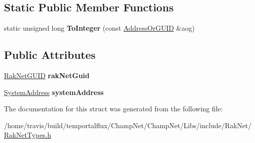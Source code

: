 \subsection*{Static Public Member Functions}
\begin{DoxyCompactItemize}
\item 
\hypertarget{struct_rak_net_1_1_address_or_g_u_i_d_abcfbbfab64e1ff1267ba5b56d57fe726}{static unsigned long {\bfseries To\-Integer} (const \hyperlink{struct_rak_net_1_1_address_or_g_u_i_d}{Address\-Or\-G\-U\-I\-D} \&aog)}\label{struct_rak_net_1_1_address_or_g_u_i_d_abcfbbfab64e1ff1267ba5b56d57fe726}

\end{DoxyCompactItemize}
\subsection*{Public Attributes}
\begin{DoxyCompactItemize}
\item 
\hypertarget{struct_rak_net_1_1_address_or_g_u_i_d_a6413c0ff87d260e1ec8394a6bf5dbb9a}{\hyperlink{struct_rak_net_1_1_rak_net_g_u_i_d}{Rak\-Net\-G\-U\-I\-D} {\bfseries rak\-Net\-Guid}}\label{struct_rak_net_1_1_address_or_g_u_i_d_a6413c0ff87d260e1ec8394a6bf5dbb9a}

\item 
\hypertarget{struct_rak_net_1_1_address_or_g_u_i_d_ad8f6c8a8f73fc2fb52cab32723f5a6f9}{\hyperlink{struct_rak_net_1_1_system_address}{System\-Address} {\bfseries system\-Address}}\label{struct_rak_net_1_1_address_or_g_u_i_d_ad8f6c8a8f73fc2fb52cab32723f5a6f9}

\end{DoxyCompactItemize}


The documentation for this struct was generated from the following file\-:\begin{DoxyCompactItemize}
\item 
/home/travis/build/temportalflux/\-Champ\-Net/\-Champ\-Net/\-Libs/include/\-Rak\-Net/\hyperlink{_rak_net_types_8h}{Rak\-Net\-Types.\-h}\end{DoxyCompactItemize}
